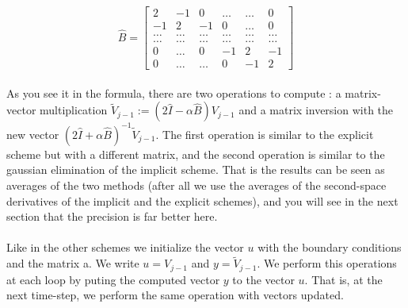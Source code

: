 \documentclass[a4paper, twoside, 11pt]{report}
\theoremstyle{theorem}
\theoremstyle{remark}
\theoremstyle{exemple}
\begin{document}
                    \begin{equation*}
                        \hat{B} =\left[\begin{matrix}
                                     2 & -1 & 0 & \dots & \dots & 0 \\
                                     -1 & 2 & -1 & 0 & \dots & 0 \\
                                     \dots & \dots & \dots & \dots & \dots & \dots\\
                                     \dots & \dots & \dots & \dots & \dots & \dots\\
                                     0 & \dots & 0 & -1 & 2 & -1 \\
                                     0 & \dots & \dots & 0 & -1 & 2
                                      \end{matrix} \right]
                    \end{equation*}

                    \paragraph{}As you see it in the formula, there are two operations to compute : a matrix-vector multiplication $\widetilde{V}_{j-1} := (2\hat{I}-\alpha \hat{B}) V_{j-1}$ and a matrix inversion with the new vector $(2\hat{I}+\alpha \hat{B})^{-1} \widetilde{V}_{j-1}$. The first operation is similar to the explicit scheme but with a different matrix, and the second operation is similar to the gaussian elimination of the implicit scheme. That is the results can be seen as averages of the two methods (after all we use the averages of the second-space derivatives of the implicit and the explicit schemes), and you will see in the next section that the precision is far better here.

                    \paragraph{}Like in the other schemes we initialize the vector $u$ with the boundary conditions and the matrix a. We write $u=V_{j-1}$ and $y=\widetilde{V}_{j-1}$. We perform this operations at each loop by puting the computed vector $y$ to the vector $u$. That is, at the next time-step, we perform the same operation with vectors updated.
\end{document}
